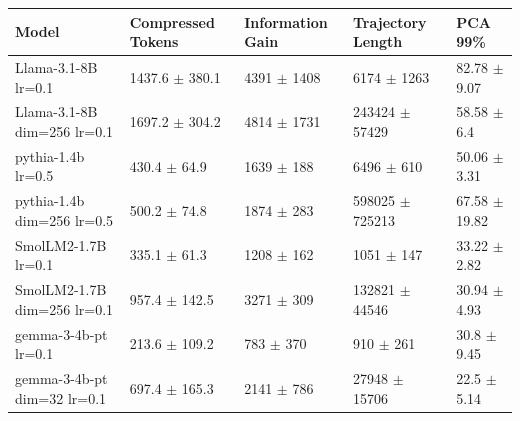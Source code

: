 \begin{tabular}{lllll}
\toprule
 Model                                         & Compressed Tokens           & Information Gain         & Trajectory Length            & PCA 99\%                    \\
\midrule
 Llama-3.1-8B {\small lr=0.1}                  & 1437.6 {\small $\pm$ 380.1} & 4391 {\small $\pm$ 1408} & 6174 {\small $\pm$ 1263}     & 82.78 {\small $\pm$ 9.07}  \\
 Llama-3.1-8B {\small dim=256} {\small lr=0.1} & 1697.2 {\small $\pm$ 304.2} & 4814 {\small $\pm$ 1731} & 243424 {\small $\pm$ 57429}  & 58.58 {\small $\pm$ 6.4}   \\
 \midrule
 pythia-1.4b {\small lr=0.5}                   & 430.4 {\small $\pm$ 64.9}   & 1639 {\small $\pm$ 188}  & 6496 {\small $\pm$ 610}      & 50.06 {\small $\pm$ 3.31}  \\
 pythia-1.4b {\small dim=256} {\small lr=0.5}  & 500.2 {\small $\pm$ 74.8}   & 1874 {\small $\pm$ 283}  & 598025 {\small $\pm$ 725213} & 67.58 {\small $\pm$ 19.82} \\
 \midrule
 SmolLM2-1.7B {\small lr=0.1}                  & 335.1 {\small $\pm$ 61.3}   & 1208 {\small $\pm$ 162}  & 1051 {\small $\pm$ 147}      & 33.22 {\small $\pm$ 2.82}  \\
 SmolLM2-1.7B {\small dim=256} {\small lr=0.1} & 957.4 {\small $\pm$ 142.5}  & 3271 {\small $\pm$ 309}  & 132821 {\small $\pm$ 44546}  & 30.94 {\small $\pm$ 4.93}  \\
 \midrule
 gemma-3-4b-pt {\small lr=0.1}                 & 213.6 {\small $\pm$ 109.2}  & 783 {\small $\pm$ 370}   & 910 {\small $\pm$ 261}       & 30.8 {\small $\pm$ 9.45}   \\
 gemma-3-4b-pt {\small dim=32} {\small lr=0.1} & 697.4 {\small $\pm$ 165.3}  & 2141 {\small $\pm$ 786}  & 27948 {\small $\pm$ 15706}   & 22.5 {\small $\pm$ 5.14}   \\
\bottomrule
\end{tabular}
